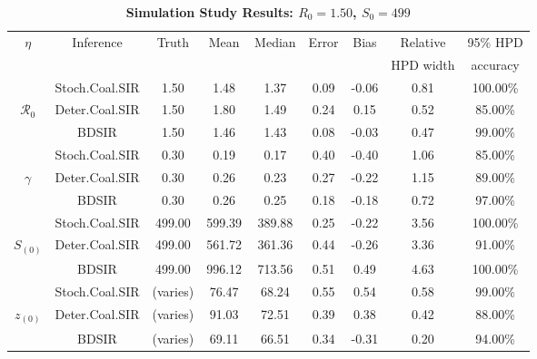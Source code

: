 \documentclass[12pt,titlepage]{article}
\newcommand{\BDSIR}{BDSIR}
\begin{document}
%
 \begin{table}[!ht]
\begin{center}
\caption{
\bf{Simulation Study Results:  $R_{0}=1.50$, $S_{0}=499$}}
\label{table:simStudy}
\begin{tabular}{|c|c|c|c|c|c|c|c|c|}
\hline
$\eta$ & Inference & Truth & Mean & Median & Error & Bias & Relative & 95\% HPD \\ 
&  &  &  &  &  &  &  HPD width & accuracy \\ 
	\hline
	\hline
& Stoch.Coal.SIR & 1.50 & 1.48 & 1.37 & 0.09 & -0.06 & 0.81 & 100.00\% \\
$\mathcal{R}_0$ & Deter.Coal.SIR & 1.50 & 1.80 & 1.49 & 0.24 & 0.15 & 0.52 & 85.00\% \\
& \BDSIR{} & 1.50 & 1.46 & 1.43 & 0.08 & -0.03 & 0.47 & 99.00\% \\ 
   \hline
   \hline 
& Stoch.Coal.SIR & 0.30 & 0.19 & 0.17 & 0.40 & -0.40 & 1.06 & 85.00\% \\
$\gamma$ & Deter.Coal.SIR  & 0.30 & 0.26 & 0.23 & 0.27 & -0.22 & 1.15 & 89.00\% \\
& \BDSIR{} & 0.30 & 0.26 & 0.25 & 0.18 & -0.18 & 0.72 & 97.00\% \\ 
   \hline
   \hline
& Stoch.Coal.SIR & 499.00 & 599.39 & 389.88 & 0.25 & -0.22 & 3.56 & 100.00\% \\
$S_{(0)}$ & Deter.Coal.SIR & 499.00 & 561.72 & 361.36 & 0.44 & -0.26 & 3.36 & 91.00\% \\
& \BDSIR{} & 499.00 & 996.12 & 713.56 & 0.51 & 0.49 & 4.63 & 100.00\% \\ 
   \hline
   \hline
& Stoch.Coal.SIR & (varies) & 76.47 & 68.24 & 0.55 & 0.54 & 0.58 & 99.00\% \\
$z_{(0)}$ & Deter.Coal.SIR & (varies) & 91.03 & 72.51 & 0.39 & 0.38 & 0.42 & 88.00\% \\
& \BDSIR{} & (varies) & 69.11 & 66.51 & 0.34 & -0.31 & 0.20 & 94.00\% \\  
   \hline
\end{tabular}
\end{center}
\end{table}
%
\end{document}
